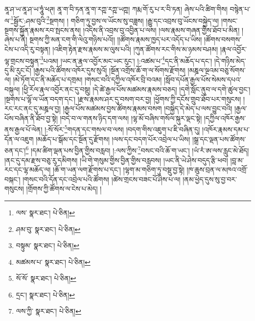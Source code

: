 ནཱ་ཤ་ཡ་ནཱ་ཤ་ཡ་ཧཱུཾ་ཕཊ། ནཱ་ག་བི་ཏན་ནཱ་ག་རཀྵ་རཀྵ་ཡཀྵ། ཀརྨ་གོ་རུ་པ་ར་བི་ཏན། ཞེས་པའི་ཚིག་གིས། བསྙེན་པ་ལ་\footnote{ལས་  སྣར་ཐང་།  པེ་ཅིན། }སྦྱོར་:ཤམ་བུའི་\footnote{ཤམ་བུ་  སྣར་ཐང་།  པེ་ཅིན། }སྔགས། །
གཅིག་ཏུ་བྱས་ལ་ཡོངས་སུ་བཟླས། །རྒྱུ་དང་འབྲས་བུ་ཡོངས་བསྐྱེད་ལ། །གསང་སྔགས་སྐྱོན་རྣམས་རབ་སྤངས་ནས། །འདིས་ནི་འབྲས་བུ་འབྱིན་པ་ལས། །ལས་རྣམས་གཞན་གྱིས་ཐོབ་པ་མིན། །ཞེས་པ་ནི། སྔགས་ཀྱི་མན་ངག་གི་ལེའུ་གཉིས་པའོ།། །།ཚོགས་རྣམས་ཁྱད་པར་འདོད་པ་ཡིས། །ཚོགས་བསགས་ངེས་པ་འདི་རུ་བསྟན། །འཇིག་རྟེན་རྫས་རྣམས་མ་ལུས་པའི། །ཀུན་ཚོགས་རང་གིས་མ་ཉམས་བཤམ། །རྣལ་འབྱོར་ལྷ་གྲངས་བསྟུན་\footnote{བསྟུམ་  སྣར་ཐང་།  པེ་ཅིན། }པའམ། །ཡང་ན་རྣལ་འབྱོར་མང་ཡང་རུང་། །:འཚམ་པ་\footnote{མཚམས་པ་  སྣར་ཐང་།  པེ་ཅིན། }དང་ནི་མཆོད་པ་དང་། །དེ་གཉིས་མེད་དུ་མི་རུང་ངོ། །རྒྱས་པའི་ཚོགས་འཁོར་དུས་སུའོ། །སྔོན་འགྲོས་ཆོ་ག་ལ་སོགས་རྫོགས། །མཎྜལ་ལྔའམ་བཅུ་སོགས་ལ། །མེ་ཏོག་དང་ནི་མཆོད་པ་དགྲམ། །གསང་བའི་དཀྱིལ་འཁོར་བྲི་བའམ། །སློབ་དཔོན་རྒྱལ་པོས་སེམས་དཔའ་བསྐུལ། །ཕྱི་རོལ་རྣལ་འབྱོར་ནང་དུ་བསྡུ། །དེ་ཚེ་རྒྱལ་པོས་མཚམས་རྣམས་བཅད། །དགེ་སློང་ནུབ་ལ་དགེ་ཚུལ་བྱང་། །སྔགས་པ་ལྷོ་ལ་ཡོན་བདག་དང་། །རྫས་རྣམས་ཤར་དུ་བསག་བར་བྱ། །ཕྱོགས་ཀྱི་དངོས་གྲུབ་ཐོབ་པར་གསུངས། །རང་རང་ནང་དུ་མཎྜལ་བྱ། །རྒྱལ་པོས་མཚམས་བྱས་ཚོགས་རྣམས་བསག །བསྐྱེད་དེ་མེད་པ་ལས་བྱུང་བའི། །རྒྱལ་པོས་བཞིན་ནི་ཐོབ་བྱ་སྟེ། །བདེ་བ་ལ་གནས་ཉིད་དག་ལས། །ལྷ་མོ་བཞིས་གསོལ་སྐུར་ལྡང་སྟེ། །དཀྱིལ་འཁོར་རྒྱས་ནས་རྒྱལ་པོ་ལེན། །:སོ་སོར་\footnote{སོ་སོ་  སྣར་ཐང་།  པེ་ཅིན། }གདན་དང་གསལ་བ་ལས། །བདག་གིས་འཇུག་པ་ཇི་བཞིན་དུ། །འཁོར་རྣམས་དམ་པ་དོན་ལ་འཇུག །མཆོད་པ་སྒོམ་དང་སྔོན་དུ་རྫོགས། །ལས་དང་བདག་པོར་འབྲེལ་པ་ཡིས། །སྒྲ་དང་ལྡན་པས་ཚོགས་ཅན་དང་།\footnote{དྲང་།  སྣར་ཐང་།  པེ་ཅིན། } །དམ་ཚིག་ལྡན་པས་བྱིན་གྱིས་བརླབ། །:ལས་ཀྱིས་\footnote{ལས་ཀྱི་  སྣར་ཐང་།  པེ་ཅིན། }བསང་བའི་ཆོ་ག་ཡང་། །ཡཾ་རཾ་ཨ་ལས་རླུང་མེ་ཐོད། །ནང་དུ་དམ་རྫས་བཅུ་རུ་དམིགས། །ཡི་གེ་གསུམ་གྱིས་བྱིན་གྱིས་བརླབས། །ཡང་ནི་ཡེ་ཤེས་བདུད་རྩི་ཕབ། །བླ་མ་རང་དང་ལྷ་མཆོད་ལ། །ཆོ་ག་ཡན་ལག་རྫོགས་པ་དང་། །ལྷག་མ་གཅིག་ཏུ་བསྡུ་བྱ་སྟེ། །ཁ་ཆུས་བྲན་ལ་མཁའ་འགྲོ་བསྐང་། །གསང་བའི་དོན་དང་འབྲེལ་པའི་ཚོགས། །ཚེས་གྲངས་བཟང་པོ་ཤིས་པ་ལ། །ནམ་ཕྱེད་དུས་སུ་བྱ་བར་གསུངས། །གྲོགས་ཀྱི་ཚོགས་ལ་ངེས་པ་མེད། །
